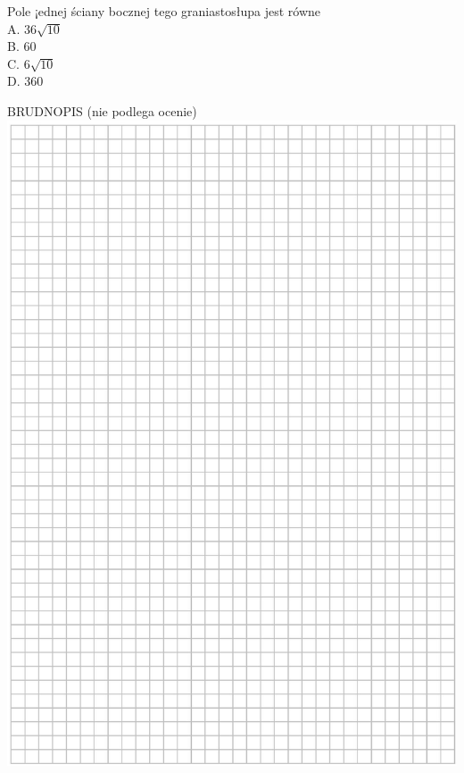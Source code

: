 \documentclass[10pt]{article}
\begin{document}
Pole ¡ednej ściany bocznej tego graniastosłupa jest równe\\
A. \(36 \sqrt{10}\)\\
B. 60\\
C. \(6 \sqrt{10}\)\\
D. 360

BRUDNOPIS (nie podlega ocenie)\\
\includegraphics[max width=\textwidth, center]{2024_11_21_0a35d272448d5080a489g-19}
\end{document}

